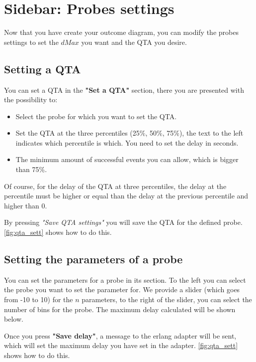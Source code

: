 \section{Sidebar: Probes settings}
    Now that you have create your outcome diagram, you can modify the probes settings to set the $dMax$ you want and the QTA you desire.

\subsection{Setting a QTA}
    You can set a QTA in the \textbf{"Set a QTA"} section, there you are presented with the possibility to:
    \begin{itemize}
        \item Select the probe for which you want to set the QTA.
        \item Set the QTA at the three percentiles (25\%, 50\%, 75\%), the text to the left indicates which percentile is which. You need to set the delay in seconds.
        \item The minimum amount of successful events you can allow, which is bigger than 75\%.
    \end{itemize}
    Of course, for the delay of the QTA at three percentiles, the delay at the percentile must be higher or equal than the delay at the previous percentile and higher than 0.
    
    By pressing \textit{"Save QTA settings"} you will save the QTA for the defined probe. \cref{fig:qta_sett} shows how to do this.

\subsection{Setting the parameters of a probe}
    You can set the parameters for a probe in its section.
    To the left you can select the probe you want to set the parameter for. 
    We provide a slider (which goes from -10 to 10) for the $n$ parameters, to the right of the slider, you can select the number of bins for the probe. The maximum delay calculated will be shown below.

    Once you press \textbf{"Save delay"}, a message to the erlang adapter will be sent, which will set the maximum delay you have set in the adapter. \cref{fig:qta_sett} shows how to do this.

